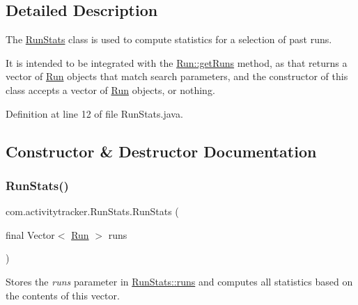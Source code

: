 \subsection{Detailed Description}
The \mbox{\hyperlink{classcom_1_1activitytracker_1_1_run_stats}{Run\+Stats}} class is used to compute statistics for a selection of past runs.

It is intended to be integrated with the \mbox{\hyperlink{classcom_1_1activitytracker_1_1_run_a1aa1fb01eabff586e16d88f19f7df743}{Run\+::get\+Runs}} method, as that returns a vector of \mbox{\hyperlink{classcom_1_1activitytracker_1_1_run}{Run}} objects that match search parameters, and the constructor of this class accepts a vector of \mbox{\hyperlink{classcom_1_1activitytracker_1_1_run}{Run}} objects, or nothing. 

Definition at line 12 of file Run\+Stats.\+java.



\subsection{Constructor \& Destructor Documentation}
\mbox{\label{classcom_1_1activitytracker_1_1_run_stats_a9c29c9a218ea2b01cfa42787b3c85f7c}} 
\subsubsection{\texorpdfstring{Run\+Stats()}{RunStats()}\hspace{0.1cm}{\footnotesize\ttfamily [1/2]}}
{\footnotesize\ttfamily com.\+activitytracker.\+Run\+Stats.\+Run\+Stats (\begin{DoxyParamCaption}\item[{final Vector$<$ \mbox{\hyperlink{classcom_1_1activitytracker_1_1_run}{Run}} $>$}]{runs }\end{DoxyParamCaption})\hspace{0.3cm}{\ttfamily [package]}}

Stores the {\itshape runs} parameter in \mbox{\hyperlink{classcom_1_1activitytracker_1_1_run_stats_a0fd429e9f463ddf4897c507c0e3c0a12}{Run\+Stats\+::runs}} and computes all statistics based on the contents of this vector.


